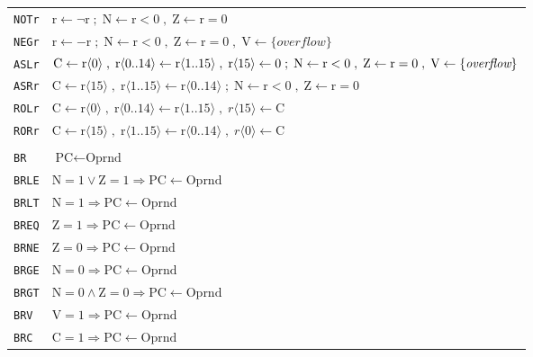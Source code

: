 \documentclass[10pt,fleqn]{book}
\newcommand{\impl}{\ensuremath{\Rightarrow}}        %
\begin{document}
\begin{tabular}{ l l }
\\
\verb|NOTr|    & $\textrm{r}\leftarrow \neg\textrm{r}\; ; \;\textrm{N}\leftarrow\textrm{r}<0 \; , \; \textrm{Z}\leftarrow\textrm{r}=0$\\
\verb|NEGr|    & $\textrm{r}\leftarrow -\textrm{r}\; ; \;\textrm{N}\leftarrow\textrm{r}<0 \; , \; \textrm{Z}\leftarrow\textrm{r}=0 \; , \; \textrm{V}\leftarrow \{\textit{overflow}\}$\\
\verb|ASLr|    & $\textrm{C}\leftarrow \textrm{r}\langle 0\rangle \; , \; \textrm{r}\langle 0..14\rangle\leftarrow\textrm{r}\langle 1..15\rangle \; , \;\textrm{r}\langle 15\rangle\leftarrow\textrm0 \; ; \; \textrm{N}\leftarrow\textrm{r}<0 \; , \; \textrm{Z}\leftarrow\textrm{r}=0 \; , \; \textrm{V}\leftarrow \{\textit{overflow}\}$\\
\verb|ASRr|    & $\textrm{C}\leftarrow \textrm{r}\langle 15\rangle \; , \; \textrm{r}\langle 1..15\rangle\leftarrow\textrm{r}\langle 0..14\rangle \; ; \; \textrm{N}\leftarrow\textrm{r}<0 \; , \; \textrm{Z}\leftarrow\textrm{r}=0$\\
\verb|ROLr|    & $\textrm{C}\leftarrow \textrm{r}\langle 0\rangle \; , \; \textrm{r}\langle 0..14\rangle\leftarrow\textrm{r}\langle 1..15\rangle \; , \;{r}\langle 15\rangle\leftarrow \textrm{C}$\\
\verb|RORr|    & $\textrm{C}\leftarrow \textrm{r}\langle 15\rangle \; , \; \textrm{r}\langle 1..15\rangle\leftarrow\textrm{r}\langle 0..14\rangle \; , \;{r}\langle 0\rangle\leftarrow \textrm{C}$\\
\\
\verb|BR|      & $\textrm{PC}\leftarrow \textrm{Oprnd}$\\
\verb|BRLE|    & $\textrm{N}=1\lor\textrm{Z}=1\impl\textrm{PC}\leftarrow \textrm{Oprnd}$\\
\verb|BRLT|    & $\textrm{N}=1\impl\textrm{PC}\leftarrow \textrm{Oprnd}$\\
\verb|BREQ|    & $\textrm{Z}=1\impl\textrm{PC}\leftarrow \textrm{Oprnd}$\\
\verb|BRNE|    & $\textrm{Z}=0\impl\textrm{PC}\leftarrow \textrm{Oprnd}$\\
\verb|BRGE|    & $\textrm{N}=0\impl\textrm{PC}\leftarrow \textrm{Oprnd}$\\
\verb|BRGT|    & $\textrm{N}=0\land\textrm{Z}=0\impl\textrm{PC}\leftarrow \textrm{Oprnd}$\\
\verb|BRV|     & $\textrm{V}=1\impl\textrm{PC}\leftarrow \textrm{Oprnd}$\\
\verb|BRC|     & $\textrm{C}=1\impl\textrm{PC}\leftarrow \textrm{Oprnd}$\\

\end{tabular}
\end{document}
